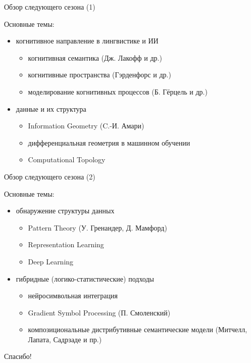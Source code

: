\documentclass{beamer}
\begin{document}
\begin{frame}{Обзор следующего сезона (1)}
\begin{small}
Основные темы:\\
\medskip
\begin{itemize}
    \item когнитивное направление в лингвистике и ИИ
    \begin{itemize}
        \item когнитивная семантика (Дж. Лакофф и др.)
        \item когнитивные пространства (Гэрденфорс и др.)
        \item моделирование когнитивных процессов (Б. Гёрцель и др.)
    \end{itemize}
	\item данные и их структура
	\begin{itemize}
    	\item Information Geometry (C.-И. Амари)
    	\item дифференциальная геометрия в машинном обучении
    	\item Computational Topology
	\end{itemize}
\end{itemize}
\end{small}
\end{frame}

\begin{frame}{Обзор следующего сезона (2)}
\begin{small}
Основные темы:\\
\medskip
\begin{itemize}
	\item обнаружение структуры данных
	\begin{itemize}
    	\item Pattern Theory (У. Гренандер, Д. Мамфорд)
	    \item Representation Learning
	    \item Deep Learning
	\end{itemize}
	\item гибридные (логико-статистические) подходы
	\begin{itemize}
    	\item нейросимвольная интеграция
	    \item Gradient Symbol Processing (П. Смоленский)
	    \item композициональные дистрибутивные семантические модели (Митчелл, Лапата, Садрзаде и пр.)
	\end{itemize}
\end{itemize}
\end{small}
\end{frame}



\begin{frame}{}
    \thispagestyle{empty}
    \begin{center}
        {\large Спасибо!}
    \end{center}
\end{frame}


\end{document}
